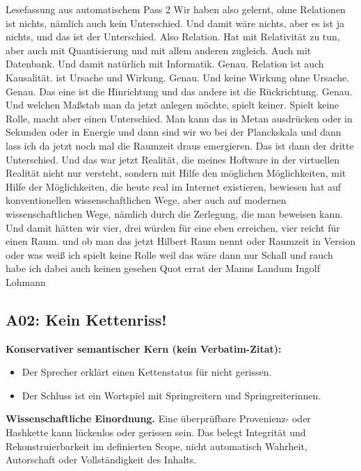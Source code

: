 \documentclass[11pt,a4paper]{article}
\begin{document}
\begin{asrbox}{Lesefassung aus automatischem Pass 2}
Wir haben also gelernt, ohne Relationen ist nichts, nämlich auch kein Unterschied. Und damit wäre nichts, aber es ist ja nichts, und das ist der Unterschied. Also Relation. Hat mit Relativität zu tun, aber auch mit Quantisierung und mit allem anderen zugleich. Auch mit Datenbank. Und damit natürlich mit Informatik. Genau. Relation ist auch Kausalität. ist Ursache und Wirkung. Genau. Und keine Wirkung ohne Ursache. Genau. Das eine ist die Hinrichtung und das andere ist die Rückrichtung. Genau. Und welchen Maßstab man da jetzt anlegen möchte, spielt keiner. Spielt keine Rolle, macht aber einen Unterschied. Man kann das in Metan ausdrücken oder in Sekunden oder in Energie und dann sind wir wo bei der Planckskala und dann lass ich da jetzt noch mal die Raumzeit draus emergieren. Das ist dann der dritte Unterschied. Und das war jetzt Realität, die meines Hoftware in der virtuellen Realität nicht nur versteht, sondern mit Hilfe den möglichen Möglichkeiten, mit Hilfe der Möglichkeiten, die heute real im Internet existieren, bewiesen hat auf konventionellen wissenschaftlichen Wege, aber auch auf modernen wissenschaftlichen Wege, nämlich durch die Zerlegung, die man beweisen kann. Und damit hätten wir vier, drei würden für eine eben erreichen, vier reicht für einen Raum. und ob man das jetzt Hilbert Raum nennt oder Raumzeit in Version oder was weiß ich spielt keine Rolle weil das wäre dann nur Schall und rauch habe ich dabei auch keinen gesehen Quot errat der Manns Landum Ingolf Lohmann
\end{asrbox}


\subsection{A02: Kein Kettenriss!}
\label{sec:a02}
\textbf{Konservativer semantischer Kern (kein Verbatim-Zitat):}
\begin{itemize}
\item Der Sprecher erklärt einen Kettenstatus für nicht gerissen.
\item Der Schluss ist ein Wortspiel mit Springreitern und Springreiterinnen.
\end{itemize}

\textbf{Wissenschaftliche Einordnung.} Eine überprüfbare Provenienz- oder Hashkette kann lückenlos oder gerissen sein. Das belegt Integrität und Rekonstruierbarkeit im definierten Scope, nicht automatisch Wahrheit, Autorschaft oder Vollständigkeit des Inhalts.
\end{document}

